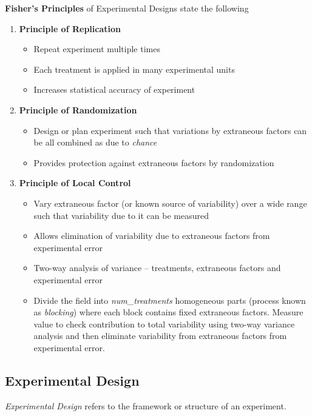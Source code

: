 \documentclass{article}
\begin{document}
\textbf{Fisher's Principles} of Experimental Designs state the following

\begin{enumerate}
    \item \textbf{Principle of Replication} 
    \begin{itemize}
        \item Repeat experiment multiple times
        \item Each treatment is applied in many experimental units
        \item Increases statistical accuracy of experiment
    \end{itemize}
    \item \textbf{Principle of Randomization}
    \begin{itemize}
        \item Design or plan experiment such that variations by extraneous factors can be all combined as due to \textit{chance}
        \item Provides protection against extraneous factors by randomization
    \end{itemize}
    \item \textbf{Principle of Local Control} 
    \begin{itemize}
        \item Vary extraneous factor (or known source of variability) over a wide range such that variability due to it can be measured
        \item Allows elimination of variability due to extraneous factors from experimental error
        \item Two-way analysis of variance -- treatments, extraneous factors and experimental error
        \item Divide the field into \textit{num\_treatments} homogeneous parts (process known as \textit{blocking}) where each block contains fixed extraneous factors. Measure value to check contribution to total variability using two-way variance analysis and then eliminate variability from extraneous factors from experimental error.
    \end{itemize}
\end{enumerate}

\subsection{Experimental Design}

\textit{Experimental Design} refers to the framework or structure of an experiment.
\end{document}
